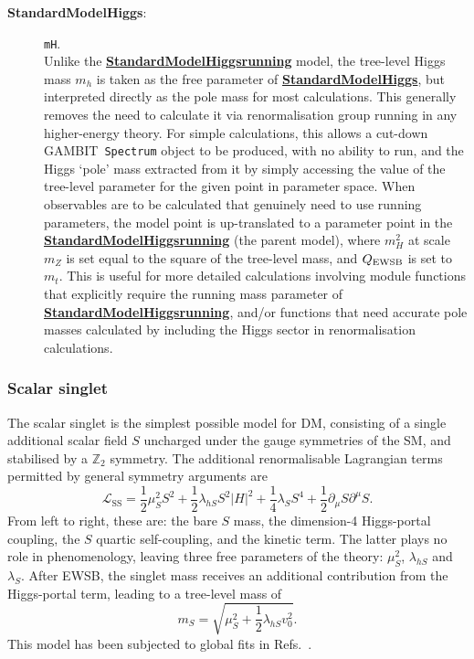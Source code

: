 \documentclass[pdftex,twocolumn,epjc3_preprint,runningheads]{svjour3}
\renewcommand{\_}{\discretionary{\underscore}{}{\underscore}}
\newcommand\cpp[1]{{\lstinline!#1!}}  %
\newcommand\term[1]{{\lstset{style=terminal}\lstinline!#1!\lstset{style=cpp}}}
\newcommand{\doublecrosssf}[2]{\hyperref[#2]{\textbf{\textsf{#1}}}}
\newcommand{\sss}{\scriptscriptstyle}
\newcommand{\lhs}{\lambda_{h\sss S}}
\newcommand{\ls}{\lambda_{\sss S}}
\newcommand{\gambit}{\textsf{GAMBIT}\xspace}
\newcommand{\GB}{\gambit}
\begin{document}
\begin{description}
\item[\textbf{\textsf{StandardModel\_Higgs}}\label{SM_h}:] \term{mH}.\\
Unlike the \doublecrosssf{StandardModel\_Higgs\_running}{SM_h_run} model, the tree-level Higgs mass $m_h$ is taken as the free parameter of \doublecrosssf{StandardModel\_Higgs}{SM_h}, but interpreted directly as the pole mass for most calculations.  This generally removes the need to calculate it via renormalisation group running in any higher-energy theory.  For simple calculations, this allows a cut-down \GB\ \cpp{Spectrum} object to be produced, with no ability to run, and the Higgs `pole' mass extracted from it by simply accessing the value of the tree-level parameter for the given point in parameter space.  When observables are to be calculated that genuinely need to use running parameters, the model point is up-translated to a parameter point in the \doublecrosssf{StandardModel\_Higgs\_running}{SM_h_run} (the parent model), where $m^2_H$ at scale $m_Z$ is set equal to the square of the tree-level mass, and $Q_{\rm EWSB}$ is set to $m_t$.  This is useful for more detailed calculations involving module functions that explicitly require the running mass parameter of \doublecrosssf{StandardModel\_Higgs\_running}{SM_h_run}, and/or functions that need accurate pole masses calculated by including the Higgs sector in renormalisation calculations.

\end{description}

\subsubsection{Scalar singlet}
The scalar singlet is the simplest possible model for DM, consisting of a single additional scalar field $S$ uncharged under the gauge symmetries of the SM, and stabilised by a $\mathbb{Z}_2$ symmetry.  The additional renormalisable Lagrangian terms permitted by general symmetry arguments are
\begin{equation}
\mathcal{L}_\mathrm{SS} = \frac12 \mu_S^2 S^2 + \frac12\lhs S^2|H|^2 + \frac14\ls S^4 + \frac12\partial_\mu S \partial^\mu S.
\end{equation}
From left to right, these are: the bare $S$ mass, the dimension-4 Higgs-portal coupling, the $S$ quartic self-coupling, and the kinetic term.  The latter plays no role in phenomenology, leaving three free parameters of the theory: $\mu_S^2$, $\lhs$ and $\ls$.  After EWSB, the singlet mass receives an additional contribution from the Higgs-portal term, leading to a tree-level mass of
\begin{equation}
\label{m_S_tree}
m_S = \sqrt{\mu_S^2 + \frac12{\lhs v_0^2}}.
\end{equation}
This model has been subjected to global fits in Refs.\ \cite{Cheung:2012xb,Cuoco:2016jqt,SSDM}.
\end{document}
